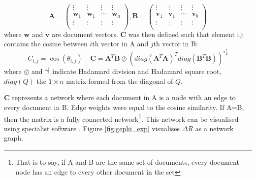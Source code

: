 $$\mathbf{A} = \left( \begin{array}{cccc}
\vdots & \vdots & \vdots & \vdots \\
\mathbf{w}_1 & \mathbf{w}_1 & \cdots & \mathbf{w}_a \\
\vdots & \vdots & \vdots & \vdots \\ \end{array} \right) , \mathbf{B} = \left( \begin{array}{cccc}
\vdots & \vdots & \vdots & \vdots \\
\mathbf{v}_1 & \mathbf{v}_1 & \cdots & \mathbf{v}_b \\
\vdots & \vdots & \vdots & \vdots \\ \end{array} \right)$$ where $\textbf{w}$ and $\textbf{v}$ are document vectors.
$\mathbf{C}$ was then defined such that element i,j contains the cosine between $i$th vector in A and $j$th vector in B:
$$C_{i , j}=\cos(\theta_{i ,j}) \ \ \ \ \ \mathbf{C}=\mathbf{A}^T \mathbf{B} \oslash \left( diag(\mathbf{A}^T \mathbf{A})^T diag(\mathbf{B}^T \mathbf{B}) \right)^{\circ\frac12}$$
where $\oslash$ and $^{\circ\frac12}$ indicate Hadamard division and Hadamard square root, $diag(Q)$ the $1 \times n$ matrix formed from the diagonal of $Q$. 

$\mathbf{C}$ represents a network where each document in A is a node with an edge to every document in B. Edge weights were equal to the cosine similarity. If A=B, then the matrix is a fully connected network\footnote{That is to say, if A and B are the same set of documents, every document node has an edge to every other document in the set}. This network can be visualised using specialist software \cite{gephi}. Figure \ref{fig:gephi_exp} visualises $\Delta R$ as a network graph.

